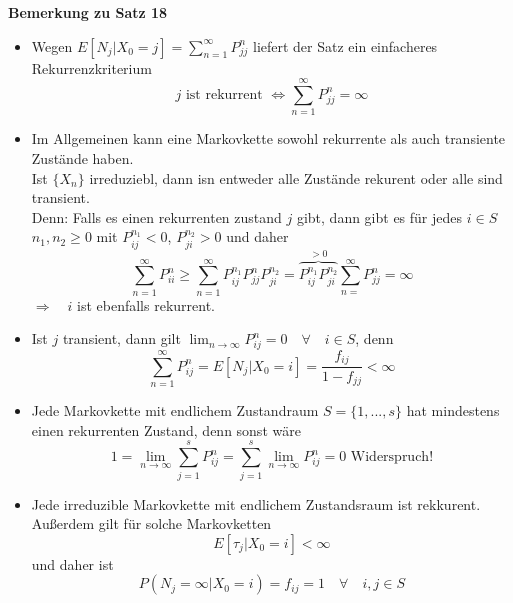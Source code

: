 \documentclass[a4paper,12pt]{article}
\begin{document}
\textbf{Bemerkung zu Satz 18}\\
\begin{itemize}
\item Wegen $E[N_j| X_0 = j ] = \sum_{n=1}^{\infty} P_{jj}^n$ liefert der Satz ein einfacheres Rekurrenzkriterium
$$
j \text{ ist rekurrent } \Leftrightarrow \sum_{n=1}^{\infty} P_{jj}^n = \infty
$$
\item Im Allgemeinen kann eine Markovkette sowohl rekurrente als auch transiente Zustände haben.\\
Ist $\{X_n\}$ irreduziebl, dann isn entweder alle Zustände rekurent oder alle sind transient.\\
Denn: Falls es einen rekurrenten zustand $j$ gibt, dann gibt es für jedes $i \in S$ $n_1,n_2 \geq 0$ mit $P_{ij}^{n_1} < 0$, $P_{ji}^{n_2}> 0$ und daher
$$
\sum_{n=1}^{\infty}P_{ii}^n \geq \sum_{n=1}^{\infty}P_{ij}^{n_1}P_{jj}^nP_{ji}^{n_2}
= \overbrace{P_{ij}^{n_1}P_{ji}^{n_2}}^{>0}\sum_{n=}^{	\infty}P_{jj}^n = \infty
$$
$\Rightarrow \quad i$ ist ebenfalls rekurrent.
\item Ist $j$ transient, dann gilt $\lim_{n \to \infty}P_{ij}^n = 0 \quad \forall \quad i \in S$, denn
$$
\sum_{n=1}^{\infty}P_{ij}^n = E\left[N_j |X_0 = i\right] = \frac{f_{ij}}{1-f_{jj}} < \infty
$$
\item Jede Markovkette mit endlichem Zustandraum $S = \{1, ..., s\}$ hat mindestens einen rekurrenten Zustand, denn sonst wäre
$$
1 = \lim_{n \to \infty}\sum_{j=1}^{s}P_{ij}^n = \sum_{j=1}^{s} \lim_{n \to \infty} P_{ij}^n = 0 \text{ Widerspruch!}
$$
\item Jede irreduzible Markovkette mit endlichem Zustandsraum ist rekkurent.
Außerdem gilt für solche Markovketten
$$
E[\tau_j | X_0 = i] < \infty
$$
und daher ist 
$$
P(N_j = \infty | X_0 = i) = f_{ij} = 1 \quad \forall \quad i,j \in S
$$
\end{itemize}
\end{document}
